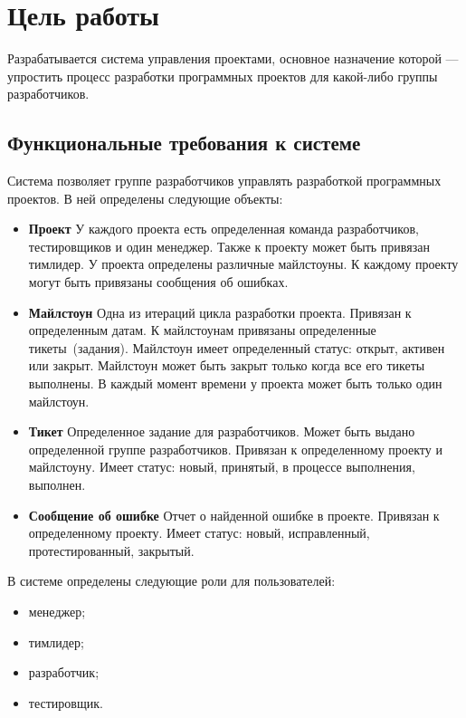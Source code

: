 




\section{Цель работы}
Разрабатывается система управления проектами, основное назначение которой --- упростить процесс разработки программных проектов для какой-либо группы разработчиков.

\subsection{Функциональные требования к системе}
Система позволяет группе разработчиков управлять разработкой программных проектов. В ней определены следующие объекты:
\begin{itemize}
\item \textbf{Проект} У каждого проекта есть определенная команда разработчиков, тестировщиков и один менеджер. Также к проекту может быть привязан тимлидер. У проекта определены различные майлстоуны. К каждому проекту могут быть привязаны сообщения об ошибках.

\item \textbf{Майлстоун} Одна из итераций цикла разработки проекта. Привязан к определенным датам. К майлстоунам привязаны определенные тикеты~(задания). Майлстоун имеет определенный статус: открыт, активен или закрыт. Майлстоун может быть закрыт только когда все его тикеты выполнены. В каждый момент времени у проекта может быть только один майлстоун.

\item \textbf{Тикет} Определенное задание для разработчиков. Может быть выдано определенной группе разработчиков. Привязан к определенному проекту и майлстоуну. Имеет статус: новый, принятый, в процессе выполнения, выполнен.

\item \textbf{Сообщение об ошибке} Отчет о найденной ошибке в проекте. Привязан к определенному проекту. Имеет статус: новый, исправленный, протестированный, закрытый.
\end{itemize}

В системе определены следующие роли для пользователей:
\begin{itemize}
\item менеджер;
\item тимлидер;
\item разработчик;
\item тестировщик.
\end{itemize}

